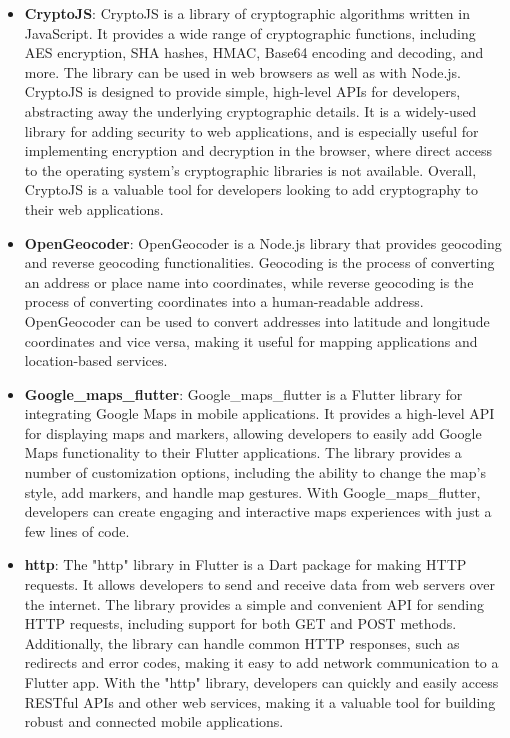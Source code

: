 \begin{itemize}
        \item\textbf{CryptoJS}: CryptoJS is a library of cryptographic algorithms written in JavaScript. It provides a wide range of cryptographic functions, including AES encryption, SHA hashes, HMAC, Base64 encoding and decoding, and more. The library can be used in web browsers as well as with Node.js. CryptoJS is designed to provide simple, high-level APIs for developers, abstracting away the underlying cryptographic details. It is a widely-used library for adding security to web applications, and is especially useful for implementing encryption and decryption in the browser, where direct access to the operating system's cryptographic libraries is not available. Overall, CryptoJS is a valuable tool for developers looking to add cryptography to their web applications.
        \item\textbf{OpenGeocoder}: OpenGeocoder is a Node.js library that provides geocoding and reverse geocoding functionalities. Geocoding is the process of converting an address or place name into coordinates, while reverse geocoding is the process of converting coordinates into a human-readable address. OpenGeocoder can be used to convert addresses into latitude and longitude coordinates and vice versa, making it useful for mapping applications and location-based services.
        \item \textbf{Google\_maps\_flutter}: Google\_maps\_flutter is a Flutter library for integrating Google Maps in mobile applications. It provides a high-level API for displaying maps and markers, allowing developers to easily add Google Maps functionality to their Flutter applications. The library provides a number of customization options, including the ability to change the map's style, add markers, and handle map gestures. With Google\_maps\_flutter, developers can create engaging and interactive maps experiences with just a few lines of code.
        \item \textbf{http}: The "http" library in Flutter is a Dart package for making HTTP requests. It allows developers to send and receive data from web servers over the internet. The library provides a simple and convenient API for sending HTTP requests, including support for both GET and POST methods. Additionally, the library can handle common HTTP responses, such as redirects and error codes, making it easy to add network communication to a Flutter app. With the "http" library, developers can quickly and easily access RESTful APIs and other web services, making it a valuable tool for building robust and connected mobile applications.

\end{itemize}
